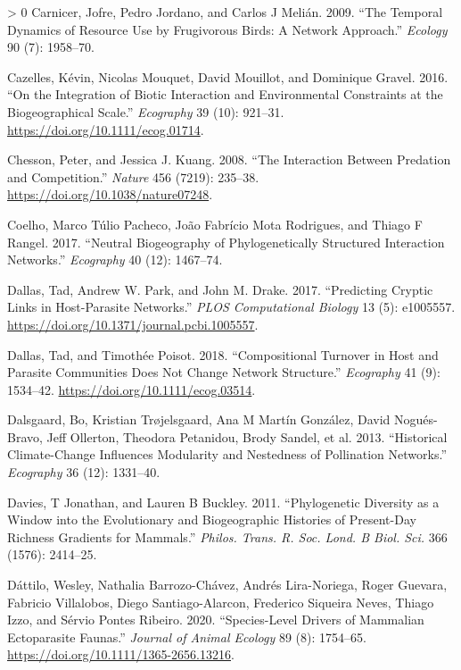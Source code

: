 \documentclass[12pt]{article}
\newlength{\cslhangindent}
\newenvironment{CSLReferences}[3] %
 {%
  \setlength{\parindent}{0pt}
  \ifodd #1 \everypar{\setlength{\hangindent}{\cslhangindent}}\ignorespaces\fi
  \ifnum #2 > 0
  \setlength{\parskip}{#2\baselineskip}
  \fi
 }%
 {}
\begin{document}
\begin{CSLReferences}{1}{0}
\leavevmode\hypertarget{ref-Carnicer2009TemDyn}{}%
Carnicer, Jofre, Pedro Jordano, and Carlos J Melián. 2009. {``The
Temporal Dynamics of Resource Use by Frugivorous Birds: A Network
Approach.''} \emph{Ecology} 90 (7): 1958--70.

\leavevmode\hypertarget{ref-Cazelles2016IntBio}{}%
Cazelles, Kévin, Nicolas Mouquet, David Mouillot, and Dominique Gravel.
2016. {``On the Integration of Biotic Interaction and Environmental
Constraints at the Biogeographical Scale.''} \emph{Ecography} 39 (10):
921--31. \url{https://doi.org/10.1111/ecog.01714}.

\leavevmode\hypertarget{ref-Chesson2008IntPre}{}%
Chesson, Peter, and Jessica J. Kuang. 2008. {``The Interaction Between
Predation and Competition.''} \emph{Nature} 456 (7219): 235--38.
\url{https://doi.org/10.1038/nature07248}.

\leavevmode\hypertarget{ref-Coelho2017NeuBio}{}%
Coelho, Marco Túlio Pacheco, João Fabrício Mota Rodrigues, and Thiago F
Rangel. 2017. {``Neutral Biogeography of Phylogenetically Structured
Interaction Networks.''} \emph{Ecography} 40 (12): 1467--74.

\leavevmode\hypertarget{ref-Dallas2017PreCry}{}%
Dallas, Tad, Andrew W. Park, and John M. Drake. 2017. {``Predicting
Cryptic Links in Host-Parasite Networks.''} \emph{PLOS Computational
Biology} 13 (5): e1005557.
\url{https://doi.org/10.1371/journal.pcbi.1005557}.

\leavevmode\hypertarget{ref-Dallas2018ComTur}{}%
Dallas, Tad, and Timothée Poisot. 2018. {``Compositional Turnover in
Host and Parasite Communities Does Not Change Network Structure.''}
\emph{Ecography} 41 (9): 1534--42.
\url{https://doi.org/10.1111/ecog.03514}.

\leavevmode\hypertarget{ref-Dalsgaard2013HisCli}{}%
Dalsgaard, Bo, Kristian Trøjelsgaard, Ana M Martín González, David
Nogués-Bravo, Jeff Ollerton, Theodora Petanidou, Brody Sandel, et al.
2013. {``Historical Climate-Change Influences Modularity and Nestedness
of Pollination Networks.''} \emph{Ecography} 36 (12): 1331--40.

\leavevmode\hypertarget{ref-Davies2011PhyDiv}{}%
Davies, T Jonathan, and Lauren B Buckley. 2011. {``Phylogenetic
Diversity as a Window into the Evolutionary and Biogeographic Histories
of Present-Day Richness Gradients for Mammals.''} \emph{Philos. Trans.
R. Soc. Lond. B Biol. Sci.} 366 (1576): 2414--25.

\leavevmode\hypertarget{ref-Dattilo2020SpeDri}{}%
Dáttilo, Wesley, Nathalia Barrozo-Chávez, Andrés Lira-Noriega, Roger
Guevara, Fabricio Villalobos, Diego Santiago-Alarcon, Frederico Siqueira
Neves, Thiago Izzo, and Sérvio Pontes Ribeiro. 2020. {``Species-Level
Drivers of Mammalian Ectoparasite Faunas.''} \emph{Journal of Animal
Ecology} 89 (8): 1754--65.
\url{https://doi.org/10.1111/1365-2656.13216}.


\end{CSLReferences}
\end{document}
